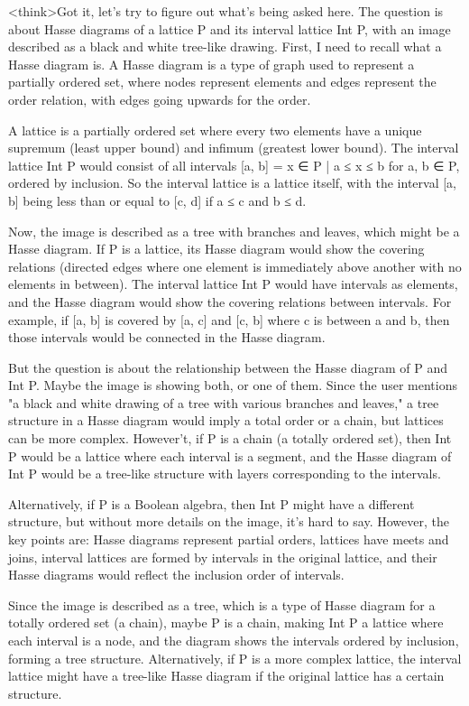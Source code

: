 <think>Got it, let's try to figure out what's being asked here. The question is about Hasse diagrams of a lattice P and its interval lattice Int P, with an image described as a black and white tree-like drawing. First, I need to recall what a Hasse diagram is. A Hasse diagram is a type of graph used to represent a partially ordered set, where nodes represent elements and edges represent the order relation, with edges going upwards for the order.

A lattice is a partially ordered set where every two elements have a unique supremum (least upper bound) and infimum (greatest lower bound). The interval lattice Int P would consist of all intervals [a, b] = {x ∈ P | a ≤ x ≤ b} for a, b ∈ P, ordered by inclusion. So the interval lattice is a lattice itself, with the interval [a, b] being less than or equal to [c, d] if a ≤ c and b ≤ d.

Now, the image is described as a tree with branches and leaves, which might be a Hasse diagram. If P is a lattice, its Hasse diagram would show the covering relations (directed edges where one element is immediately above another with no elements in between). The interval lattice Int P would have intervals as elements, and the Hasse diagram would show the covering relations between intervals. For example, if [a, b] is covered by [a, c] and [c, b] where c is between a and b, then those intervals would be connected in the Hasse diagram.

But the question is about the relationship between the Hasse diagram of P and Int P. Maybe the image is showing both, or one of them. Since the user mentions "a black and white drawing of a tree with various branches and leaves," a tree structure in a Hasse diagram would imply a total order or a chain, but lattices can be more complex. However't, if P is a chain (a totally ordered set), then Int P would be a lattice where each interval is a segment, and the Hasse diagram of Int P would be a tree-like structure with layers corresponding to the intervals.

Alternatively, if P is a Boolean algebra, then Int P might have a different structure, but without more details on the image, it's hard to say. However, the key points are: Hasse diagrams represent partial orders, lattices have meets and joins, interval lattices are formed by intervals in the original lattice, and their Hasse diagrams would reflect the inclusion order of intervals.

Since the image is described as a tree, which is a type of Hasse diagram for a totally ordered set (a chain), maybe P is a chain, making Int P a lattice where each interval is a node, and the diagram shows the intervals ordered by inclusion, forming a tree structure. Alternatively, if P is a more complex lattice, the interval lattice might have a tree-like Hasse diagram if the original lattice has a certain structure.

